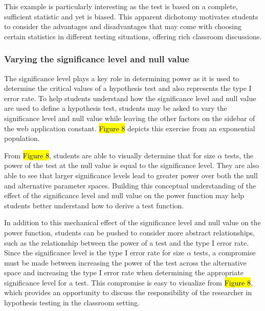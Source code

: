 \documentclass{TISE}
\begin{document}
This example is particularly interesting as the test is based on a complete, sufficient statistic and yet is biased. This apparent dichotomy motivates students to consider the advantages and disadvantages that may come with choosing certain statistics in different testing situations, offering rich classroom discussions. 

\subsubsection{Varying the significance level and null value}

The significance level plays a key role in determining power as it is used to determine the critical values of a hypothesis test and also represents the type I error rate. To help students understand how the significance level and null value are used to define a hypothesis test, students may be asked to vary the significance level and null value while leaving the other factors on the sidebar of the web application constant. \hl{Figure 8} depicts this exercise from an exponential population. 

From \hl{Figure 8}, students are able to visually determine that for size $\alpha$ tests, the power of the test at the null value is equal to the significance level. They are also able to see that larger significance levels lead to greater power over both the null and alternative parameter spaces. Building this conceptual understanding of the effect of the significance level and null value on the power function may help students better understand how to derive a test function. 

In addition to this mechanical effect of the significance level and null value on the power function, students can be pushed to consider more abstract relationships, such as the relationship between the power of a test and the type I error rate. Since the significance level is the type I error rate for size $\alpha$ tests, a compromise must be made between increasing the power of the test across the alternative space and increasing the type I error rate when determining the appropriate significance level for a test. This compromise is easy to visualize from \hl{Figure 8}, which provides an opportunity to discuss the responsibility of the researcher in hypothesis testing in the classroom setting.
\end{document}

